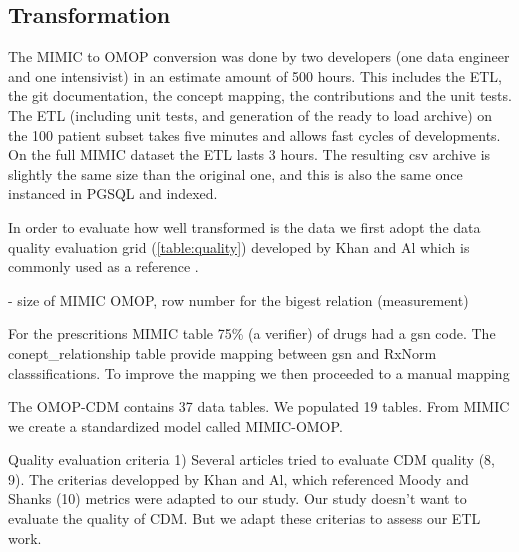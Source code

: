 %
%
% 
\subsection{Transformation}

The MIMIC to OMOP conversion was done by two developers (one data engineer and
one intensivist) in an estimate amount of 500 hours. This includes the ETL, the
git documentation, the concept mapping, the contributions and the unit tests.
The ETL (including unit tests, and generation of the ready to load archive) on
the 100 patient subset takes five minutes and allows fast cycles of
developments. On the full MIMIC dataset the ETL lasts 3 hours. 
The resulting csv archive is slightly the same size than the original one, and
this is also the same once instanced in PGSQL and indexed.


In order to evaluate how well transformed is the data we first adopt the data
quality evaluation grid (\ref{table:quality}) developed by Khan and Al
\cite{khan-quality} which is commonly used as a reference \cite{moody-quality}.

- size of MIMIC OMOP, row number for the bigest relation (measurement)

  For the prescritions MIMIC table 75\% (a verifier) of drugs had a gsn code. The conept\_relationship table provide mapping between gsn and RxNorm classsifications. To improve the mapping we then proceeded to a manual mapping

The OMOP-CDM contains 37 data tables. We populated 19 tables.
From MIMIC we create a standardized model called MIMIC-OMOP.

Quality evaluation criteria
1)
Several articles tried to evaluate CDM quality (8, 9).
The criterias developped by Khan and Al, which referenced Moody and Shanks (10) metrics were adapted to our study.
Our study doesn't want to evaluate the quality of CDM. But we adapt these criterias to assess our ETL work.

